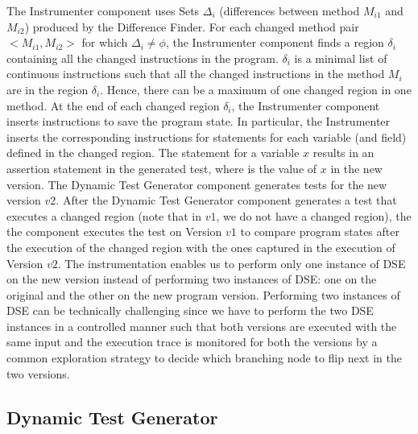 The Instrumenter component uses Sets $\Delta_i$ (differences between method $M_{i1}$ and $M_{i2}$) produced by the Difference Finder. For each changed method pair $<M_{i1}, M_{i2}>$ for which $\Delta_i \neq \phi$, the Instrumenter component finds a region $\delta_i$ containing all the changed instructions in the program. $\delta_i$ is a minimal list of continuous instructions such that all the changed instructions in the method $M_i$ are in the region $\delta_i$. Hence, there can be a maximum of one changed region in one method. At the end of each changed region $\delta_i$, the Instrumenter component inserts instructions to save the program state. In particular, the Instrumenter inserts the corresponding instructions for  statements for each variable (and field) defined in the changed region.
The  statement for a variable $x$ results in an assertion statement  in the generated test, where  is the value of $x$ in the new version.
The Dynamic Test Generator component generates tests for the new version $v2$.
After the Dynamic Test Generator component generates a test that executes a changed region (note that in $v1$, we do not have a changed region), 
the the component executes the test on Version $v1$ 
to compare program states after the execution of the changed region
with the ones captured in the execution of Version $v2$. The instrumentation enables us to perform only one instance of DSE on the new version instead of performing two instances of DSE: one on the original and the other on the new program version. Performing two instances of DSE can be technically challenging since we have to perform the two DSE instances in a controlled manner such that both versions are executed  with the same input and the execution trace is monitored for both the versions by a common exploration strategy to decide which branching node to flip next in the two versions.



\subsection{Dynamic Test Generator}


